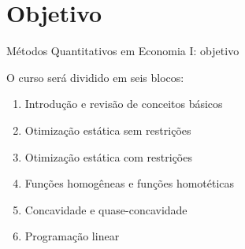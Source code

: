 \documentclass[10pt]{beamer}
\begin{document}
\section{Objetivo}
\begin{frame}{Métodos Quantitativos em Economia I: objetivo}
    \begin{center}
        \begin{minipage}{.9\textwidth}
        \end{minipage}
    \end{center}

    O curso será dividido em seis blocos:\medskip
    \begin{enumerate}
        \item Introdução e revisão de conceitos básicos\medskip

        \item Otimização estática sem restrições\medskip

        \item Otimização estática com restrições\medskip

        \item Funções homogêneas e funções homotéticas\medskip

        \item Concavidade e quase-concavidade\medskip

        \item Programação linear
    \end{enumerate}
\end{frame}
\end{document}
